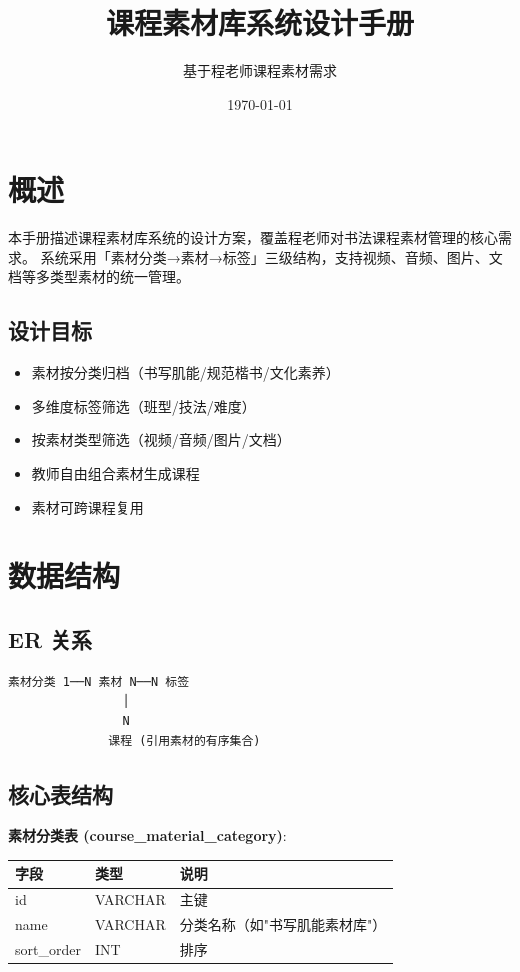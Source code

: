 \documentclass[11pt,a4paper]{article}
\begin{document}
\title{\vspace{-2cm}\textbf{课程素材库系统设计手册}}
\author{基于程老师课程素材需求}
\date{\today}
\maketitle

\section{概述}

本手册描述课程素材库系统的设计方案，覆盖程老师对书法课程素材管理的核心需求。
系统采用「素材分类→素材→标签」三级结构，支持视频、音频、图片、文档等多类型素材的统一管理。

\subsection{设计目标}

\begin{itemize}
  \item 素材按分类归档（书写肌能/规范楷书/文化素养）
  \item 多维度标签筛选（班型/技法/难度）
  \item 按素材类型筛选（视频/音频/图片/文档）
  \item 教师自由组合素材生成课程
  \item 素材可跨课程复用
\end{itemize}

\section{数据结构}

\subsection{ER 关系}

\begin{verbatim}
素材分类 1──N 素材 N──N 标签
                │
                N
              课程 (引用素材的有序集合)
\end{verbatim}

\subsection{核心表结构}

\textbf{素材分类表 (course\_material\_category)}:

\begin{tabular}{lll}
\toprule
字段 & 类型 & 说明 \\
\midrule
id & VARCHAR & 主键 \\
name & VARCHAR & 分类名称（如"书写肌能素材库"） \\
sort\_order & INT & 排序 \\
\bottomrule
\end{tabular}
\end{document}
